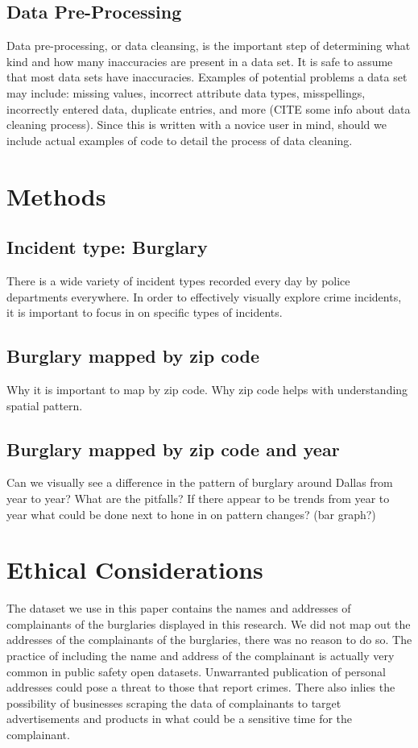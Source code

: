 \documentclass[runningheads]{llncs}
\begin{document}
\subsection{Data Pre-Processing}
Data pre-processing, or data cleansing, is the important step of determining what kind and how many inaccuracies are present in a data set. It is safe to assume that most data sets have inaccuracies. Examples of potential problems a data set may include: missing values, incorrect attribute data types, misspellings, incorrectly entered data, duplicate entries, and more (CITE some info about data cleaning process).
Since this is written with a novice user in mind, should we include actual examples of code to detail the process of data cleaning. 

\section{Methods}
\subsection{Incident type: Burglary}
There is a wide variety of incident types recorded every day by police departments everywhere. In order to effectively visually explore crime incidents, it is important to focus in on specific types of incidents. 

\subsection{Burglary mapped by zip code}
Why it is important to map by zip code.
Why zip code helps with understanding spatial pattern.

\subsection{Burglary mapped by zip code and year}
Can we visually see a difference in the pattern of burglary around Dallas from year to year? 
What are the pitfalls?
If there appear to be trends from year to year what could be done next to hone in on pattern changes? (bar graph?)

\section{Ethical Considerations}
The dataset we use in this paper contains the names and addresses of complainants of the burglaries displayed in this research. We did not map out the addresses of the complainants of the burglaries, there was no reason to do so. The practice of including the name and address of the complainant is actually very common in public safety open datasets. Unwarranted publication of personal addresses could pose a threat to those that report crimes. There also inlies the possibility of businesses scraping the data of complainants to target advertisements and products in what could be a sensitive time for the complainant. 
\end{document}
